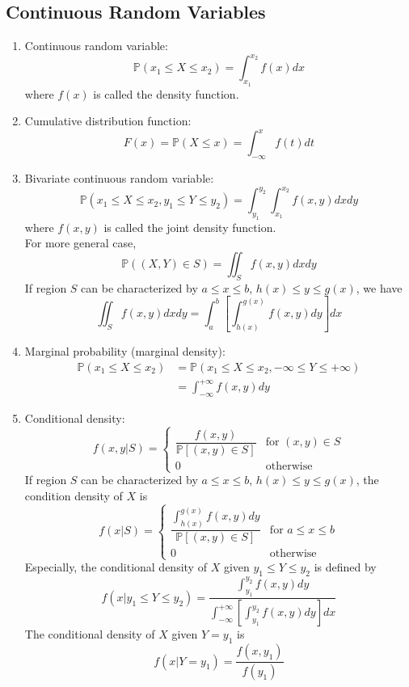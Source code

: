 \documentclass[%
 aip,
 jmp,%
 amsmath,amssymb,
 reprint,%
]{revtex4-1}
\def\P{\mathbb{P}}
\begin{document}
\subsection{Continuous Random Variables}
\begin{enumerate}
  \item Continuous random variable: $$\P(x_1\le X\le x_2)=\int_{x_1}^{x_2}f(x)dx$$
  where $f(x)$ is called the density function.

  \item Cumulative distribution function:
  $$ F(x) = \P(X \le x) = \int_{-\infty}^{x} f(t)dt $$

  \item Bivariate continuous random variable:\footnotesize
  $$ \P(x_1 \le X \le x_2, y_1 \le Y \le y_2) = \int_{y_1}^{y_2}\int_{x_1}^{x_2}f(x,y)dxdy $$
  \normalsize where $f(x,y)$ is called the joint density function. \\
  For more general case,
  $$ \P((X,Y) \in S) = \iint_{S} f(x,y)dxdy $$
  If region $S$ can be characterized by $a \le x \le b$, $h(x) \le y \le g(x)$, we have
  $$ \iint_{S} f(x,y)dxdy = \int_a^b\left[\int_{h(x)}^{g(x)}f(x,y)dy\right]dx$$

  \item Marginal probability (marginal density): {\footnotesize
    \begin{align*}
      \P(x_1 \le X \le x_2) &= \P(x_1 \le X \le x_2, -\infty \le Y \le +\infty) \\
                            &= \int_{-\infty}^{+\infty}f(x,y)dy
    \end{align*}
   }

   \item Conditional density:
   $$ f(x,y|S) = \begin{cases}
                     \dfrac{f(x,y)}{\P[(x,y)\in S]} &\textrm{for } (x,y)\in S\\
                     0 &\textrm{otherwise}
                 \end{cases}
   $$
   If region $S$ can be characterized by $a \le x \le b$, $h(x) \le y \le g(x)$,
   the condition density of $X$ is
   $$ f(x|S) = \begin{cases}
                     \dfrac{\int_{h(x)}^{g(x)}f(x,y)dy}{\P[(x,y)\in S]} &\textrm{for } a \le x \le b\\
                     0 &\textrm{otherwise}
                 \end{cases}
   $$
   Especially, the conditional density of $X$ given $y_1 \le Y \le y_2$ is defined by
   $$ f(x|y_1 \le Y \le y_2) = \frac{\int_{y_1}^{y_2}f(x,y)dy}
         {\int_{-\infty}^{+\infty}\left[\int_{y_1}^{y_2}f(x,y)dy\right]dx}
   $$
   The conditional density of $X$ given $Y=y_1$ is
   $$ f(x|Y=y_1) = \frac{f(x,y_1)}{f(y_1)} $$


\end{enumerate}
\end{document}
